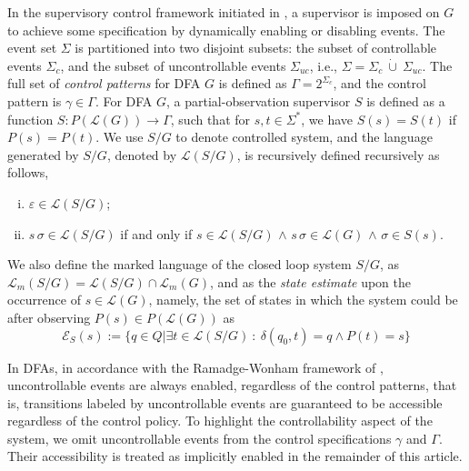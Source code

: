\documentclass[journal,twoside,web]{ieeecolor}
\begin{document}
In the supervisory control framework initiated in \cite{ramadge1987supervisory}, a supervisor is imposed on $G$ to achieve some specification by dynamically enabling or disabling events. 
The event set $\Sigma$ is partitioned into two disjoint subsets: the subset of controllable events $\Sigma_c$, and the subset of uncontrollable events $\Sigma_{uc}$, i.e., 
$\Sigma = \Sigma_c \ \dot{\cup} \ \Sigma_{uc}$.
%
The full set of \emph{control patterns} for DFA $G$ is defined as $\Gamma = 2^{\Sigma_c}$, and the control pattern is $\gamma \in \Gamma$.
%
For DFA $G$, a partial-observation supervisor $S$ is defined as a function $S : P(\mathcal{L}(G)) \rightarrow \Gamma$, such that for $s, t \in \Sigma^*$, we have $S(s) = S(t)$ if $P(s) = P(t)$.
%
We use $S / G$ to denote controlled system, and the language generated by $S /G$, denoted by $\mathcal{L}(S / G)$, is recursively defined recursively as follows,
\begin{enumerate}[(i)]
    \item $\varepsilon \in \mathcal{L}(S / G)$;
    \item $s \, \sigma \in \mathcal{L}(S / G)$ if and only if
    $s \in \mathcal{L}(S / G)$ $\wedge$ $s \, \sigma \in \mathcal{L}(G)$ $\wedge$ $\sigma \in S(s)$.
\end{enumerate}
We also define the marked language of the closed loop system $S / G$, as $\mathcal{L}_m(S / G) = \mathcal{L}(S / G) \cap \mathcal{L}_m(G)$, and
as the \emph{state estimate} upon the occurrence of $s \in \mathcal{L}(G)$, namely, the set of states in which the system could be after observing $P(s) \in P(\mathcal{L}(G))$ as
\begin{equation}\label{eq:esti:1}
\mathcal{E}_S(s) := \{q \in Q | \exists t \in \mathcal{L}(S / G) \ : \ \delta(q_0, t) = q \wedge P(t) = s\}
\end{equation}

\begin{remark}\label{rem:uc_ctrl_pattern}
    In DFAs, in accordance with the Ramadge-Wonham framework of \textup{\cite{ramadge1987supervisory}}, uncontrollable events are always enabled, regardless of the control patterns, that is, transitions labeled by uncontrollable events are guaranteed to be accessible regardless of the control policy.
    To highlight the controllability aspect of the system, we omit uncontrollable events from the control specifications $\gamma$ and $\Gamma$.
    Their accessibility is treated as implicitly enabled in the remainder of this article.
\end{remark}
\end{document}
